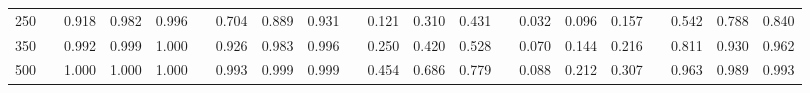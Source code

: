 % 
\begin{tabular}{ccccccccccccccccccccc}
  \hline
  \hline
250 &  & 0.918 & 0.982 & 0.996 &  & 0.704 & 0.889 & 0.931 &  & 0.121 & 0.310 & 0.431 &  & 0.032 & 0.096 & 0.157 &  & 0.542 & 0.788 & 0.840 \\ 
  350 &  & 0.992 & 0.999 & 1.000 &  & 0.926 & 0.983 & 0.996 &  & 0.250 & 0.420 & 0.528 &  & 0.070 & 0.144 & 0.216 &  & 0.811 & 0.930 & 0.962 \\ 
  500 &  & 1.000 & 1.000 & 1.000 &  & 0.993 & 0.999 & 0.999 &  & 0.454 & 0.686 & 0.779 &  & 0.088 & 0.212 & 0.307 &  & 0.963 & 0.989 & 0.993 \\ 
   \hline
\end{tabular}
